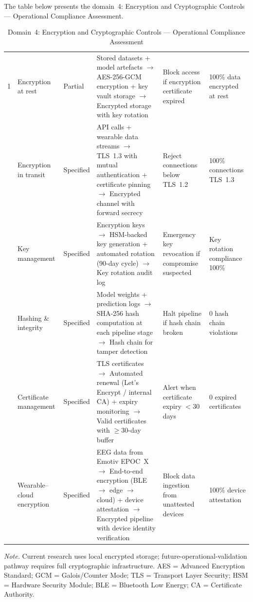\noindent The table below presents the domain~4: Encryption and Cryptographic Controls --- Operational Compliance Assessment.

\begin{table}[H]
\tablestripes
\tablefontsize
\caption[Encryption and Cryptographic Controls Assessment]{Domain~4: Encryption and Cryptographic Controls --- Operational Compliance Assessment}
\begin{tabularx}{\textwidth}{@{} p{0.4cm} p{2cm} p{1.4cm} L L p{1.8cm} @{}}
\toprule
\thead{\#} &  &  &  &  &  \\
 & Encryption at rest & Partial & Stored datasets + model artefacts $\to$ AES-256-GCM encryption + key vault storage $\to$ Encrypted storage with key rotation & Block access if encryption certificate expired & 100\% data encrypted at rest \\
 & Encryption in transit & Specified & API calls + wearable data streams $\to$ TLS~1.3 with mutual authentication + certificate pinning $\to$ Encrypted channel with forward secrecy & Reject connections below TLS~1.2 & 100\% connections TLS~1.3 \\
 & Key management & Specified & Encryption keys $\to$ HSM-backed key generation + automated rotation (90-day cycle) $\to$ Key rotation audit log & Emergency key revocation if compromise suspected & Key rotation compliance 100\% \\
 & Hashing \& integrity & Specified & Model weights + prediction logs $\to$ SHA-256 hash computation at each pipeline stage $\to$ Hash chain for tamper detection & Halt pipeline if hash chain broken & 0 hash chain violations \\
 & Certificate management & Specified & TLS certificates $\to$ Automated renewal (Let's Encrypt / internal CA) + expiry monitoring $\to$ Valid certificates with $\geq$30-day buffer & Alert when certificate expiry $<$30 days & 0 expired certificates \\
 & Wearable--cloud encryption & Specified & EEG data from Emotiv EPOC~X $\to$ End-to-end encryption (BLE $\to$ edge $\to$ cloud) + device attestation $\to$ Encrypted pipeline with device identity verification & Block data ingestion from unattested devices & 100\% device attestation \\
\bottomrule
\end{tabularx}
\vspace{0.5em}\noindent\textit{Note.} Current research uses local encrypted storage; future-operational-validation pathway requires full cryptographic infrastructure. AES = Advanced Encryption Standard; GCM = Galois/Counter Mode; TLS = Transport Layer Security; HSM = Hardware Security Module; BLE = Bluetooth Low Energy; CA = Certificate Authority.
\end{table}


